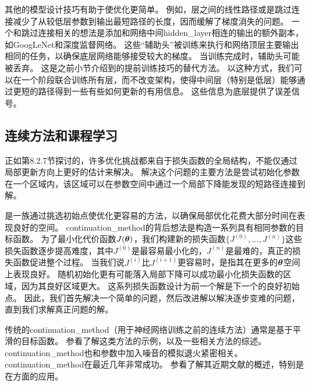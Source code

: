 其他的模型设计技巧有助于使优化更简单。
例如，层之间的线性路径或是跳过连接减少了从较低层参数到输出最短路径的长度，因而缓解了梯度消失的问题\citep{Srivastava-et-al-arxiv2015}。
一个和跳过连接相关的想法是添加和网络中间\gls{hidden_layer}相连的输出的额外副本，如GoogLeNet\citep{Szegedy-et-al-arxiv2014}和深度监督网络\citep{Lee-et-al-2014}。
这些“辅助头”被训练来执行和网络顶层主要输出相同的任务，以确保底层网络能够接受较大的梯度。
当训练完成时，辅助头可能被丢弃。
这是之前小节介绍到的提前训练技巧的替代方法。
以这种方式，我们可以在一个阶段联合训练所有层，而不改变架构，使得中间层（特别是低层）能够通过更短的路径得到一些有些如何更新的有用信息。
这些信息为底层提供了误差信号。


\subsection{连续方法和课程学习}
\label{sec:continuation_methods_and_curriculum_learning}
正如第8.2.7节探讨的，许多优化挑战都来自于损失函数的全局结构，不能仅通过局部更新方向上更好的估计来解决。
解决这个问题的主要方法是尝试初始化参数在一个区域内，该区域可以在参数空间中通过一个局部下降能发现的短路径连接到解。

是一族通过挑选初始点使优化更容易的方法，以确保局部优化花费大部分时间在表现良好的空间。
\gls{continuation_method}的背后想法是构造一系列具有相同参数的目标函数。
为了最小化代价函数$J(\boldsymbol{\theta})$，我们构建新的损失函数$\{J^{(0)},...,J^{(n)}\}$这些损失函数逐步提高难度，其中$J^{(0)}$是最容易最小化的，$J^{(n)}$是最难的，真正的损失函数促进整个过程。
当我们说$J^{(i)}$比$J^{(i+1)}$更容易时，是指其在更多的$\boldsymbol{\theta}$空间上表现良好。
随机初始化更有可能落入局部下降可以成功最小化损失函数的区域，因为其良好区域更大。
这系列损失函数设计为前一个解是下一个的良好初始点。
因此，我们首先解决一个简单的问题，然后改进解以解决逐步变难的问题，直到我们求解真正问题的解。

传统的\gls{continuation_method}（用于神经网络训练之前的连续方法）通常是基于平滑的目标函数。
参看\cite{Wu-97}了解这类方法的示例，以及一些相关方法的综述。
\gls{continuation_method}也和参数中加入噪音的模拟退火紧密相关\citep{Kirkpatrick83}。
\gls{continuation_method}在最近几年非常成功。
参看\cite{Mobahi+Fisher-AAAI2015}了解其近期文献的概述，特别是在方面的应用。


